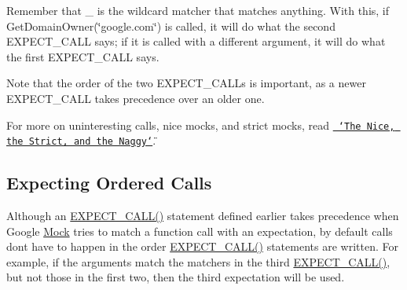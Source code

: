 \begin{DoxyCode}{0}
\end{DoxyCode}


Remember that {\ttfamily \+\_\+} is the wildcard matcher that matches anything. With this, if {\ttfamily Get\+Domain\+Owner(\char`\"{}google.\+com\char`\"{})} is called, it will do what the second {\ttfamily E\+X\+P\+E\+C\+T\+\_\+\+C\+A\+LL} says; if it is called with a different argument, it will do what the first {\ttfamily E\+X\+P\+E\+C\+T\+\_\+\+C\+A\+LL} says.

Note that the order of the two {\ttfamily E\+X\+P\+E\+C\+T\+\_\+\+C\+A\+L\+Ls} is important, as a newer {\ttfamily E\+X\+P\+E\+C\+T\+\_\+\+C\+A\+LL} takes precedence over an older one.

For more on uninteresting calls, nice mocks, and strict mocks, read \href{\#the-nice-the-strict-and-the-naggy}{\texttt{ \char`\"{}\+The Nice, the Strict, and the Naggy\char`\"{}}}.

\subsection*{Expecting Ordered Calls}

Although an {\ttfamily \mbox{\hyperlink{googletest-master_2googlemock_2include_2gmock_2gmock-spec-builders_8h_a535a6156de72c1a2e25a127e38ee5232}{E\+X\+P\+E\+C\+T\+\_\+\+C\+A\+L\+L()}}} statement defined earlier takes precedence when Google \mbox{\hyperlink{class_mock}{Mock}} tries to match a function call with an expectation, by default calls don\textquotesingle{}t have to happen in the order {\ttfamily \mbox{\hyperlink{googletest-master_2googlemock_2include_2gmock_2gmock-spec-builders_8h_a535a6156de72c1a2e25a127e38ee5232}{E\+X\+P\+E\+C\+T\+\_\+\+C\+A\+L\+L()}}} statements are written. For example, if the arguments match the matchers in the third {\ttfamily \mbox{\hyperlink{googletest-master_2googlemock_2include_2gmock_2gmock-spec-builders_8h_a535a6156de72c1a2e25a127e38ee5232}{E\+X\+P\+E\+C\+T\+\_\+\+C\+A\+L\+L()}}}, but not those in the first two, then the third expectation will be used.

